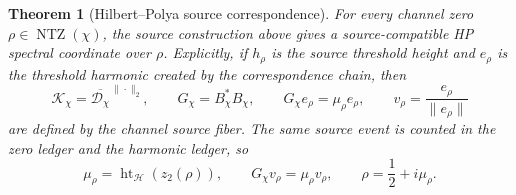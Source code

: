\documentclass[11pt]{article}
\newtheorem{theorem}[definition]{Theorem}
\DeclareMathOperator{\NTZ}{NTZ}
\DeclareMathOperator{\hgt}{ht}
\begin{document}
\begin{theorem}[Hilbert--Polya source correspondence]
For every channel zero $\rho\in\NTZ(\chi)$, the source construction above gives
a source-compatible HP spectral coordinate over $\rho$.  Explicitly, if
$h_\rho$ is the source threshold height and $e_\rho$ is the threshold harmonic
created by the correspondence chain, then
\[
  \mathcal K_\chi=\overline{\mathcal D_\chi}^{\,\|\cdot\|_2},\qquad
  G_\chi=B_\chi^*B_\chi,
  \qquad
  G_\chi e_\rho=\mu_\rho e_\rho,
  \qquad
  v_\rho=\frac{e_\rho}{\|e_\rho\|}
\]
are defined by the channel source fiber.  The same source event is counted in
the zero ledger and the harmonic ledger, so
\[
  \mu_\rho=\hgt_{\mathcal H}(z_2(\rho)),
  \qquad
  G_\chi v_\rho=\mu_\rho v_\rho,
  \qquad
  \rho=\frac12+i\mu_\rho .
\]
\end{theorem}
\end{document}
